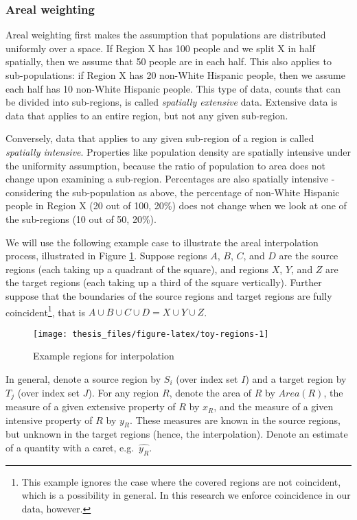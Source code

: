 \documentclass[12pt,twoside]{reedthesis}
\begin{document}
\hypertarget{areal-weighting}{%
\subsubsection{Areal weighting}\label{areal-weighting}}

Areal weighting first makes the assumption that populations are distributed uniformly over a space. If Region X has 100 people and we split X in half spatially, then we assume that 50 people are in each half. This also applies to sub-populations: if Region X has 20 non-White Hispanic people, then we assume each half has 10 non-White Hispanic people. This type of data, counts that can be divided into sub-regions, is called \emph{spatially extensive} data. Extensive data is data that applies to an entire region, but not any given sub-region.

Conversely, data that applies to any given sub-region of a region is called \emph{spatially intensive}. Properties like population density are spatially intensive under the uniformity assumption, because the ratio of population to area does not change upon examining a sub-region. Percentages are also spatially intensive - considering the sub-population as above, the percentage of non-White Hispanic people in Region X (20 out of 100, 20\%) does not change when we look at one of the sub-regions (10 out of 50, 20\%).

We will use the following example case to illustrate the areal interpolation process, illustrated in Figure \ref{fig:toy-regions}. Suppose regions \(A\), \(B\), \(C\), and \(D\) are the source regions (each taking up a quadrant of the square), and regions \(X\), \(Y\), and \(Z\) are the target regions (each taking up a third of the square vertically). Further suppose that the boundaries of the source regions and target regions are fully coincident\footnote{This example ignores the case where the covered regions are not coincident, which is a possibility in general. In this research we enforce coincidence in our data, however.}, that is \(A \cup B \cup C \cup D = X \cup Y \cup Z\).
\begin{figure}
\texttt{[image: thesis\_files/figure-latex/toy-regions-1]} \caption{Example regions for interpolation}\label{fig:toy-regions}
\end{figure}
In general, denote a source region by \(S_i\) (over index set \(I\)) and a target region by \(T_j\) (over index set \(J\)). For any region \(R\), denote the area of \(R\) by \(Area(R)\), the measure of a given extensive property of \(R\) by \(x_R\), and the measure of a given intensive property of \(R\) by \(y_R\). These measures are known in the source regions, but unknown in the target regions (hence, the interpolation). Denote an estimate of a quantity with a caret, e.g.~\(\widehat{y_{R}}\).
\end{document}
